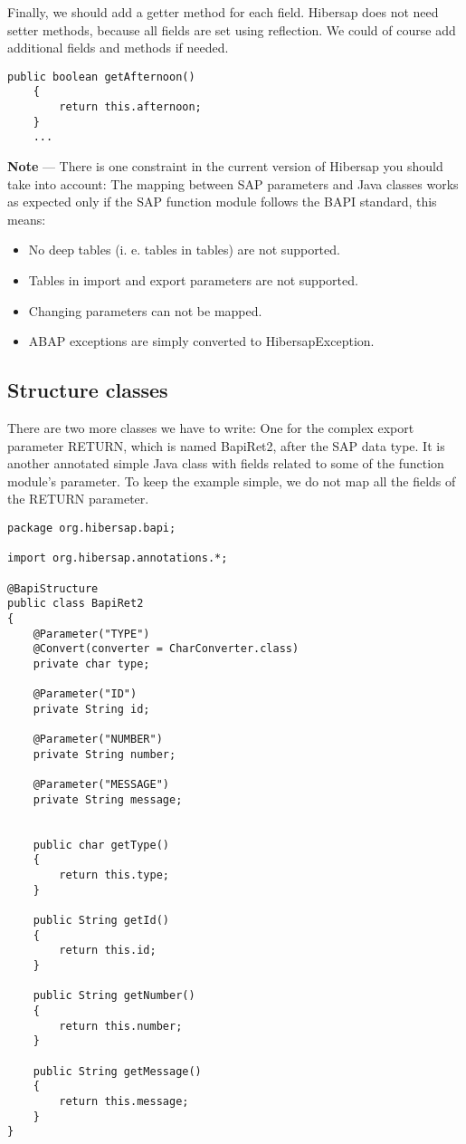 Finally, we should add a getter method for each field.
Hibersap does not need setter methods, because all fields are set using reflection.
We could of course add additional fields and methods if needed.

\begin{Verbatim}[frame=single,label=The getter methods]
    public boolean getAfternoon()
    {
        return this.afternoon;
    }
    ...
\end{Verbatim}

\HRule

\textbf{Note} --- There is one constraint in the current version of Hibersap you should take into account: The mapping
between SAP parameters and Java classes works as expected only if the SAP function module follows the BAPI standard,
this means:
\begin{itemize}
  \item No deep tables (i. e. tables in tables) are not supported.
  \item Tables in import and export parameters are not supported.
  \item Changing parameters can not be mapped.
  \item ABAP exceptions are simply converted to HibersapException.
\end{itemize}

\HRule


\subsection{Structure classes}

There are two more classes we have to write:
One for the complex export parameter RETURN, which is named BapiRet2, after the SAP data type.
It is another annotated simple Java class with fields related to some of the function module's parameter.
To keep the example simple, we do not map all the fields of the RETURN parameter.

\begin{Verbatim}[frame=single,label=The BapiRet2 class]
package org.hibersap.bapi;

import org.hibersap.annotations.*;

@BapiStructure
public class BapiRet2
{
    @Parameter("TYPE")
    @Convert(converter = CharConverter.class)
    private char type;

    @Parameter("ID")
    private String id;

    @Parameter("NUMBER")
    private String number;

    @Parameter("MESSAGE")
    private String message;


    public char getType()
    {
        return this.type;
    }

    public String getId()
    {
        return this.id;
    }

    public String getNumber()
    {
        return this.number;
    }

    public String getMessage()
    {
        return this.message;
    }
}
\end{Verbatim}

